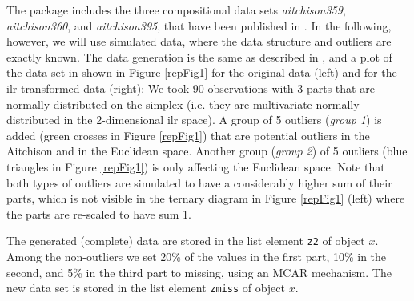 \documentclass{scrartcl}\usepackage[]{graphicx}\usepackage[]{color}
\begin{document}
The package includes the three compositional data sets {\it aitchison359},
{\it aitchison360}, and {\it aitchison395}, that have been published
in \cite{Aitchison86}. In the following, however, we will use simulated data,
where the data structure and outliers are exactly known.
The data generation is the same as described in \cite{Hron09}, and
a plot of the data set in shown in Figure \ref{repFig1} for the original
data (left) and for the ilr transformed data (right): We took 90 
observations with 3 parts that are normally distributed on the simplex
(i.e. they are multivariate normally distributed in the 2-dimensional
ilr space). A group of 5 outliers ({\it group 1}) 
is added (green crosses in Figure \ref{repFig1})
that are potential outliers in the Aitchison and in the Euclidean space.
Another group ({\it group 2}) of 5 outliers (blue triangles in Figure \ref{repFig1})
is only affecting the Euclidean space. Note that both types of outliers are
simulated to have a considerably higher sum of their parts, which is not visible
in the ternary diagram \citep{Aitchison86} in Figure \ref{repFig1} (left) where the parts
are re-scaled to have sum 1.

The generated (complete) data are stored in the list element \texttt{z2}
of object $x$. Among the non-outliers we set 20\% of the values in the first
part, 10\% in the second, and 5\% in the third part to missing, using an
MCAR mechanism. The new data set is stored in the list element \texttt{zmiss} of object $x$.




 
\end{document}
